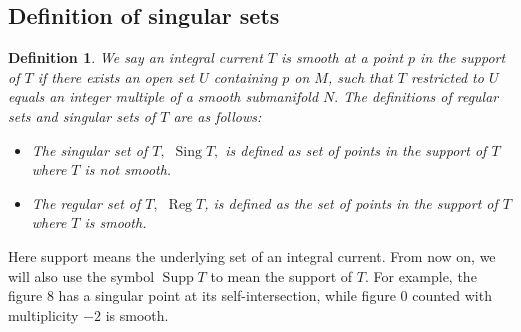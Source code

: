 \documentclass[11pt,a4paper]{amsart}
\numberwithin{equation}{section}
\newcommand{\supp}{\operatorname{Supp}}
\newcommand{\sing}{{\operatorname{Sing}}}
\theoremstyle{plain}
\newtheorem{defn}[exam]{Definition}
\theoremstyle{definition}
\numberwithin{equation}{subsection}
\begin{document}
	\subsection{Definition of singular sets}
	\begin{defn}\label{defnsm}
		We say an integral current $T$ is smooth at a point $p$ in the support of $T$ if there exists an open set $U$ containing $p$ on $M$, such that  $T$ restricted to $U$ equals an integer multiple of a smooth submanifold $N.$ The definitions of regular sets and singular sets of $T$ are as follows:
		\begin{itemize}
			\item The singular set of $T,$ $\sing T,$ is defined as set of points in the support of $T$ where $T$ is not smooth.		
			\item 
			The regular set of $T,$ $\operatorname{Reg}T$, is defined as the set of points in the support of $T$ where $T$ is smooth. 
		\end{itemize}
	\end{defn} 
	Here support means the underlying set of an integral current. From now on, we will also use the symbol $\supp T$ to mean the support of $T.$ %
	For example, the figure $8$ has a singular point at its self-intersection, while figure $0$ counted with multiplicity $-2$ is smooth.
\end{document}
